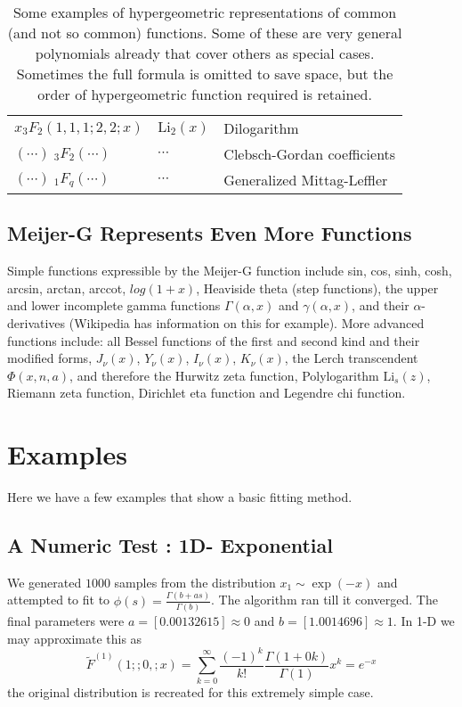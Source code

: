 \documentclass{article}
\begin{document}
\begin{table}[h]
\begin{tabular}{|p{4.5cm}|p{1.5cm}|p{5cm}|}
$x_3F_2(1,1,1;2,2;x)$ & $\mathrm{Li}_2(x)$ & Dilogarithm \\
$(\cdots)\;_3F_2(\cdots)$ & $\cdots$ & Clebsch-Gordan coefficients \\
$(\cdots)\;_1F_q(\cdots)$ & $\cdots$ & Generalized Mittag-Leffler \\
\hline
\end{tabular}
\caption{Some examples of hypergeometric representations of common (and not so common) functions. Some of these are very general polynomials already that cover others as special cases. Sometimes the full formula is omitted to save space, but the order of hypergeometric function required is retained.}
\label{tab:hyp}
\end{table}

\subsection{Meijer-G Represents Even More Functions}
Simple functions expressible by the Meijer-G function include sin, cos, sinh, cosh, arcsin, arctan, arccot, $log(1+x)$, Heaviside theta (step functions), the upper and lower incomplete gamma functions $\Gamma(\alpha,x)$ and $\gamma(\alpha,x)$, and their $\alpha$-derivatives (Wikipedia has information on this for example). More advanced functions include: all Bessel functions of the first and second kind and their modified forms, $J_\nu(x)$, $Y_\nu(x)$, $I_\nu(x)$, $K_\nu(x)$, the Lerch transcendent $\Phi(x,n,a)$, and therefore the Hurwitz zeta function, Polylogarithm $\mathrm{Li}_s(z)$, Riemann zeta function, Dirichlet eta function and Legendre chi function.

\section{Examples}
Here we have a few examples that show a basic fitting method.

\subsection{A Numeric Test : 1D- Exponential}
We generated $1000$ samples from the distribution $x_1 \sim \exp(-x)$ and attempted to fit to $\phi(s) = \frac{\Gamma(b + a s)}{\Gamma(b)}$. The algorithm ran till it converged. The final parameters were $a = [0.00132615]\approx 0$ and $b=[1.0014696]\approx 1$. In 1-D we may approximate this as \begin{equation}
\tilde{F}^{(1)}(1;;0,;x) = \sum_{k=0}^\infty \frac{(-1)^k}{k!} \frac{\Gamma(1+0k)}{\Gamma(1)} x^k = e^{-x}
\end{equation}
the original distribution is recreated for this extremely simple case.
\end{document}
